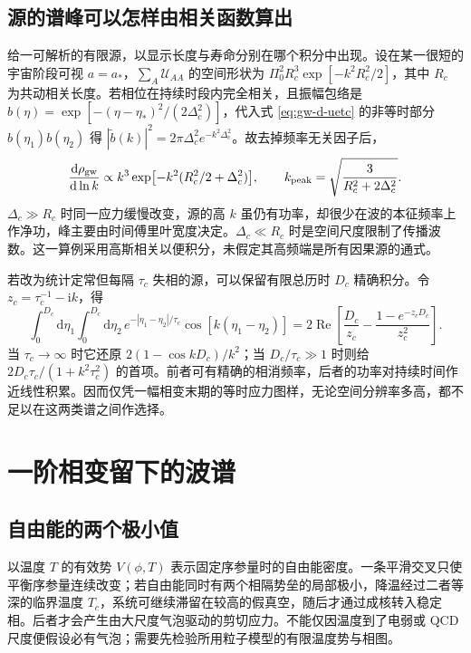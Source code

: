 \subsection{源的谱峰可以怎样由相关函数算出}

给一可解析的有限源，以显示长度与寿命分别在哪个积分中出现。设在某一很短的宇宙阶段可视 $a=a_*$，$\sum_A\mathcal U_{AA}$ 的空间形状为 $\Pi_0^2 R_c^3\exp[-k^2R_c^2/2]$，其中 $R_c$ 为共动相关长度。若相位在持续时段内完全相关，且振幅包络是 $b(\eta)=\exp[-(\eta-\eta_*)^2/(2\Delta_c^2)]$，代入式 \eqref{eq:gw-d-uetc} 的非等时部分 $b(\eta_1)b(\eta_2)$ 得 $|\widetilde b(k)|^2=2\pi\Delta_c^2e^{-k^2\Delta_c^2}$。故去掉频率无关因子后，
\[
 \frac{\mathrm d\rho_{\rm gw}}{\mathrm d\ln k}
 \propto k^3 \exp[-k^2(R_c^2/2+\Delta_c^2)],\qquad
 k_{\rm peak}=\sqrt{\frac{3}{R_c^2+2\Delta_c^2}} .
\]
$\Delta_c\gg R_c$ 时同一应力缓慢改变，源的高 $k$ 虽仍有功率，却很少在波的本征频率上作净功，峰主要由时间傅里叶宽度决定。$\Delta_c\ll R_c$ 时是空间尺度限制了传播波数。这一算例采用高斯相关以便积分，未假定其高频端是所有因果源的通式。

若改为统计定常但每隔 $\tau_c$ 失相的源，可以保留有限总历时 $D_c$ 精确积分。令 $z_c=\tau_c^{-1}-\mathrm i k$，得
\[
 \int_0^{D_c}\!\mathrm d\eta_1\!\int_0^{D_c}\!\mathrm d\eta_2\,
 e^{-|\eta_1-\eta_2|/\tau_c}\cos[k(\eta_1-\eta_2)]
 =2\operatorname{Re}\!\left[\frac{D_c}{z_c}
             -\frac{1-e^{-z_cD_c}}{z_c^2}\right].
\]
当 $\tau_c\to\infty$ 时它还原 $2(1-\cos kD_c)/k^2$；当 $D_c/\tau_c\gg1$ 时则给 $2D_c\tau_c/(1+k^2\tau_c^2)$ 的首项。前者可有精确的相消频率，后者的功率对持续时间作近线性积累。因而仅凭一幅相变末期的等时应力图样，无论空间分辨率多高，都不足以在这两类谱之间作选择。
\section{一阶相变留下的波谱}\label{sec:gw-dphase}

\subsection{自由能的两个极小值}

以温度 $T$ 的有效势 $V(\phi,T)$ 表示固定序参量时的自由能密度。一条平滑交叉只使平衡序参量连续改变；若自由能同时有两个相隔势垒的局部极小，降温经过二者等深的临界温度 $T_c$，系统可继续滞留在较高的假真空，随后才通过成核转入稳定相。后者才会产生由大尺度气泡驱动的剪切应力。不能仅因温度到了电弱或 QCD 尺度便假设必有气泡；需要先检验所用粒子模型的有限温度势与相图。

